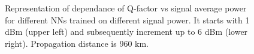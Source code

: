 \begin{figure}[tpb]
    \begin{minipage}[h]{0.48\linewidth}
    \end{minipage}
    \hfill
    \begin{minipage}[h]{0.48\linewidth}
    \end{minipage}
    \caption{Representation of dependance of Q-factor vs signal average power for different NNs trained on different signal power. It starts with 1 dBm (upper left) and subsequently increment up to 6 dBm (lower right). Propagation distance is 960 km.}
    \label{fig:nn_eq_z_960}
\end{figure}

